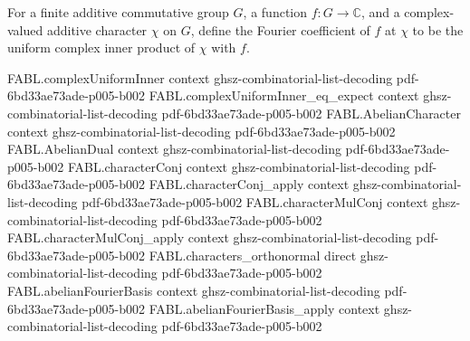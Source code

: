 \begin{definition}
\label{FABL.abelianFourierCoeff}
\leanok
{}
For a finite additive commutative group $G$, a function $f:G\to\mathbb{C}$, and a
complex-valued additive character $\chi$ on $G$, define the Fourier coefficient of $f$
at $\chi$ to be the uniform complex inner product of $\chi$ with $f$.
\end{definition}

\begin{theorem}
\label{FABL.abelianFourierBasis_repr_eq_fourierCoeff}
\leanok
{}
\proofstep
  {FABL.complexUniformInner}
  {context}
  {ghsz-combinatorial-list-decoding}
  {pdf-6bd33ae73ade-p005-b002}
\proofstep
  {FABL.complexUniformInner_eq_expect}
  {context}
  {ghsz-combinatorial-list-decoding}
  {pdf-6bd33ae73ade-p005-b002}
\proofstep
  {FABL.AbelianCharacter}
  {context}
  {ghsz-combinatorial-list-decoding}
  {pdf-6bd33ae73ade-p005-b002}
\proofstep
  {FABL.AbelianDual}
  {context}
  {ghsz-combinatorial-list-decoding}
  {pdf-6bd33ae73ade-p005-b002}
\proofstep
  {FABL.characterConj}
  {context}
  {ghsz-combinatorial-list-decoding}
  {pdf-6bd33ae73ade-p005-b002}
\proofstep
  {FABL.characterConj_apply}
  {context}
  {ghsz-combinatorial-list-decoding}
  {pdf-6bd33ae73ade-p005-b002}
\proofstep
  {FABL.characterMulConj}
  {context}
  {ghsz-combinatorial-list-decoding}
  {pdf-6bd33ae73ade-p005-b002}
\proofstep
  {FABL.characterMulConj_apply}
  {context}
  {ghsz-combinatorial-list-decoding}
  {pdf-6bd33ae73ade-p005-b002}
\proofstep
  {FABL.characters_orthonormal}
  {direct}
  {ghsz-combinatorial-list-decoding}
  {pdf-6bd33ae73ade-p005-b002}
\proofstep
  {FABL.abelianFourierBasis}
  {context}
  {ghsz-combinatorial-list-decoding}
  {pdf-6bd33ae73ade-p005-b002}
\proofstep
  {FABL.abelianFourierBasis_apply}
  {context}
  {ghsz-combinatorial-list-decoding}
  {pdf-6bd33ae73ade-p005-b002}
\proofstep

\end{theorem}
